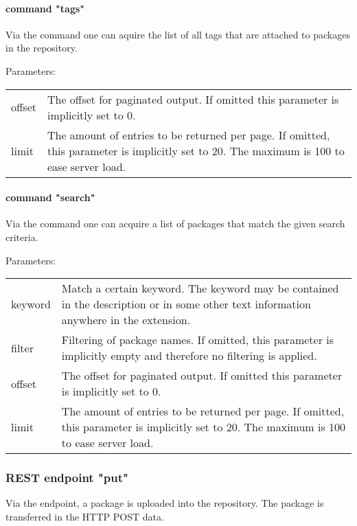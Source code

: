 \paragraph{command "tags"}

Via the  command one can aquire the list of all tags that are attached to packages in the repository.

Parameters:\\
\begin{tabular}{lp{}}\\
offset & The offset for paginated output. If omitted this parameter is implicitly set to 0. \\ 
limit & The amount of entries to be returned per page. If omitted, this parameter is implicitly set to 20. The maximum is 100 to ease server load.
\end{tabular}

\paragraph{command "search"}

Via the  command one can acquire a list of packages that match the given search criteria.

Parameters:\\
\begin{tabular}{lp{}}\\
keyword & Match a certain keyword. The keyword may be contained in the description or in some other text information anywhere in the extension.\\
filter & Filtering of package names. If omitted, this parameter is implicitly empty and therefore no filtering is applied.\\ 
offset & The offset for paginated output. If omitted this parameter is implicitly set to 0. \\ 
limit & The amount of entries to be returned per page. If omitted, this parameter is implicitly set to 20. The maximum is 100 to ease server load.
\end{tabular}

\subsubsection[sec:repository rest api endpoint put]{REST endpoint "put"}

Via the  endpoint, a package is uploaded into the repository. The package is transferred in the HTTP POST data.

